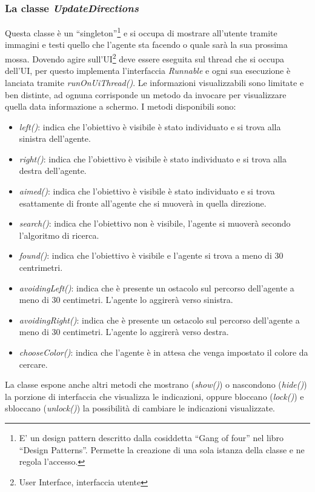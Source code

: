 \subsubsection{La classe \emph{UpdateDirections}}
 Questa classe è un ``singleton''\footnote{E' un design pattern descritto dalla 
 cosiddetta ``Gang of four'' nel libro ``Design Patterns''. 
 Permette la creazione di una sola istanza della classe e ne regola l'accesso. } 
 e si occupa di mostrare all'utente tramite  immagini e testi quello che l'agente
 sta facendo o quale sarà la sua prossima  mossa. Dovendo agire 
 sull'UI\footnote{User Interface, interfaccia utente} deve essere eseguita sul thread
 che si occupa dell'UI, per questo implementa l'interfaccia \emph{Runnable} e 
 ogni sua esecuzione è lanciata  tramite \emph{runOnUiThread()}. 
 Le informazioni visualizzabili sono limitate e ben distinte,
 ad ognuna corrisponde un metodo da invocare per visualizzare quella data informazione
 a schermo. I metodi disponibili sono: 
 \begin{itemize}
 \item \emph{left()}: indica che l'obiettivo è visibile è stato individuato e si trova alla sinistra dell'agente.
 \item \emph{right()}: indica che l'obiettivo è visibile è stato individuato e si trova alla destra dell'agente.
 \item \emph{aimed()}: indica che l'obiettivo è visibile è stato individuato e si trova esattamente di fronte all'agente che si muoverà in quella direzione.
 \item \emph{search()}: indica che l'obiettivo non è visibile, l'agente si muoverà secondo l'algoritmo di ricerca.
 \item \emph{found()}: indica che l'obiettivo è visibile e l'agente si trova a meno di 30 centrimetri.
 \item \emph{avoidingLeft()}: indica che è presente un ostacolo sul percorso dell'agente a meno di 30 centimetri. L'agente lo aggirerà verso sinistra. 
 \item \emph{avoidingRight()}: indica che è presente un ostacolo sul percorso dell'agente a meno di 30 centimetri. L'agente lo aggirerà verso destra.
 \item \emph{chooseColor()}: indica che l'agente è in attesa che venga impostato il colore da cercare. 
 \end{itemize}
 La classe espone anche altri metodi che mostrano (\emph{show()}) o nascondono 
 (\emph{hide()}) la porzione di interfaccia che visualizza le indicazioni, oppure bloccano (\emph{lock()})
 e sbloccano (\emph{unlock()}) la possibilità di cambiare le indicazioni visualizzate.

